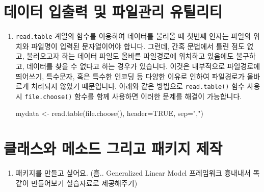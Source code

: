 \documentclass{article}
\begin{document}




%
%

\section{데이터 입출력 및 파일관리 유틸리티}
\begin{enumerate}
\item \texttt{read.table} 계열의 함수를 이용하여 데이터를 불러올 때 첫번째 인자는 파일의 위치와 파일명이 입력된 문자열이어야 합니다.
그런데, 간혹 문법에서 틀린 점도 없고, 불러오고자 하는 데이터 파일도 올바른 파일경로에 위치하고 있음에도 불구하고,
데이터를 찾을 수 없다고 하는 경우가 있습니다.
이것은 내부적으로 파일경로에 띄어쓰기, 특수문자, 혹은 특수한 인코딩 등 다양한 이유로 인하여 파일경로가 올바르게 처리되지 않았기 때문입니다.
아래와 같은 방법으로 \texttt{read.table()} 함수 사용시 \texttt{file.choose()} 함수를 함께 사용하면 이러한 문제를 해결이 가능합니다.


\begin{Schunk}
\begin{Soutput}
mydata <- read.table(file.choose(), header=TRUE, sep=",")
\end{Soutput}
\end{Schunk}


\end{enumerate}




%
%

\section{클래스와 메소드 그리고 패키지 제작}
\begin{enumerate}
\item 패키지를 만들고 싶어요. (흠.. Generalized Linear Model 프레임워크 흉내내서 똑같이 만들어보기 실습자료로 제공해주기)
\end{enumerate}



%
%
\end{document}
